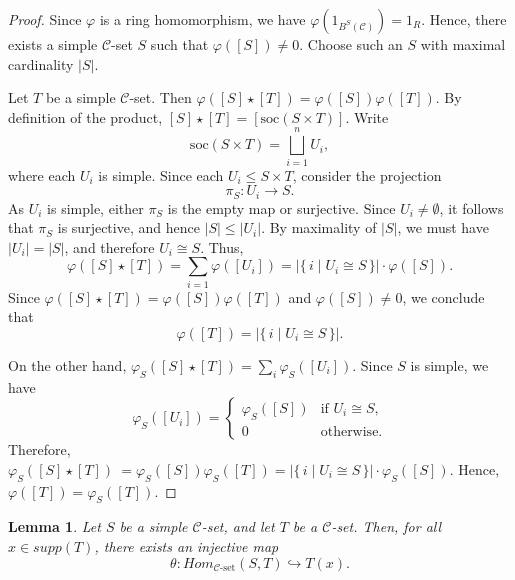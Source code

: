 \documentclass[a4paper]{article}
\newtheorem{lem}[thm]{Lemma}
\theoremstyle{definition}
\theoremstyle{remark}
\newcommand*{\cat}[1]{\mathcal{#1}}
\begin{document}
\begin{proof}
    Since $\varphi$ is a ring homomorphism, we have $\varphi(1_{B^S(\cat{C})})=1_R$. Hence, there exists a simple $\cat{C}$-set $S$ such that $\varphi([S])\neq 0$. Choose such an $S$ with maximal cardinality $|S|$.

Let $T$ be a simple $\cat{C}$-set. Then $\varphi([S] \star [T]) = \varphi([S])\varphi([T]).
 $
By definition of the product, $[S] \star [T] = [\mathrm{soc}(S \times T)]. $ Write
\[
\mathrm{soc}(S \times T) = \bigsqcup_{i=1}^n U_i,
\]
where each $U_i$ is simple. Since each $U_i \leq S \times T$, consider the projection
\[
\pi_S \colon U_i \longrightarrow S.
\]
As $U_i$ is simple, either $\pi_S$ is the empty map or surjective. Since $U_i \neq \emptyset$, it follows that $\pi_S$ is surjective, and hence $ |S| \leq |U_i|.
$
By maximality of $|S|$, we must have $|U_i| = |S|$, and therefore $U_i \cong S.$ Thus,
\[
\varphi([S] \star [T]) = \sum_{i=1} \varphi([U_i])
= |\{\, i \mid U_i \cong S \,\} |\cdot \varphi([S]).
\]
Since $\varphi([S] \star [T])=\varphi([S])\varphi([T])$ and $\varphi([S])\neq 0$, we conclude that
\[
\varphi([T]) = |\{\, i \mid U_i \cong S \,\}|.
\]

On the other hand, $\varphi_S([S] \star [T]) = \sum_i \varphi_S([U_i]).
 $
Since $S$ is simple, we have
\[
\varphi_S([U_i]) =
\begin{cases}
\varphi_S([S]) & \text{if } U_i \cong S,\\
0 & \text{otherwise}.
\end{cases}
\]
Therefore, $\varphi_S([S] \star [T])\
=  \varphi_S([S])\varphi_S([T])=|\{\, i \mid U_i \cong S \,\} |\cdot \varphi_S([S]). $ Hence, $\varphi([T]) = \varphi_S([T]).
$
\end{proof}
\begin{lem}
 Let $S$ be a simple $\cat{C}$-set, and let $T$ be a $\cat{C}$-set. Then, for all $x \in supp(T)$, there exists an injective map
\[
\theta \colon Hom_{\cat{C}\text{-set}}(S,T) \hookrightarrow T(x).
\]
\end{lem}
\end{document}
